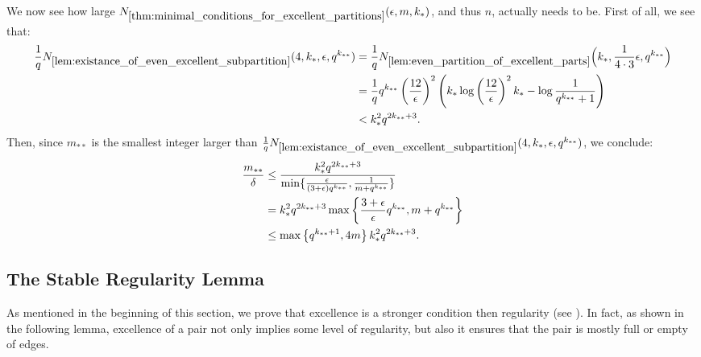         \begin{remark}
            We now see how large $N_{\ref{thm:minimal_conditions_for_excellent_partitions}}( \epsilon, m, k_* )$, and thus $n$, actually needs to be.
            First of all, we see that:
            \begin{align*}
                \frac{1}{q} N_{\ref{lem:existance_of_even_excellent_subpartition}}( 4, k_*, \epsilon, q^{k_{**}} )
                    & = \frac{1}{q} N_{\ref{lem:even_partition_of_excellent_parts}}\Bigl( k_*, \frac{1}{4 \cdot 3} \epsilon, q^{k_{**}} \Bigr) \\
                    & = \frac{1}{q} q^{k_{**}} \left( \frac{12}{\epsilon} \right)^2
                        \left( k_* \log{\left( \frac{12}{\epsilon} \right)^2 k_*} - \log{\frac{1}{q^{k_{**}}+1}} \right) \\
                    & < k_*^2 q^{2 k_{**} + 3}.
            \end{align*}
            Then, since $m_{**}$ is the smallest integer larger than $\frac{1}{q} N_{\ref{lem:existance_of_even_excellent_subpartition}}( 4, k_*, \epsilon, q^{k_{**}} )$,
            we conclude:
            \begin{align*}
                \frac{m_{**}}{\delta}
                    & \leq \frac{k_*^2 q^{2 k_{**} + 3}}
                        {\min \{ \frac{\epsilon}{( 3 + \epsilon ) q^{k_{**}}}, \frac{1}{m + q^{k_{**}}} \}} \\
                    & = k_*^2 q^{2 k_{**} + 3} \max \left\{ \frac{3 + \epsilon}{\epsilon} q^{k_{**}}, m + q^{k_{**}} \right\} \\
                    & \leq \max \left\{ q^{k_{**} + 1}, 4m \right\} k_*^2 q^{2 k_{**} + 3}.
            \end{align*}
        \end{remark}

    \subsection{The Stable Regularity Lemma} \label{subsec:subsection_5.3}

        As mentioned in the beginning of this section, we prove that excellence is a stronger condition then
        regularity (see ).
        In fact, as shown in the following lemma, excellence of a pair not only implies some level of regularity, but
        also it ensures that the pair is mostly full or empty of edges.

